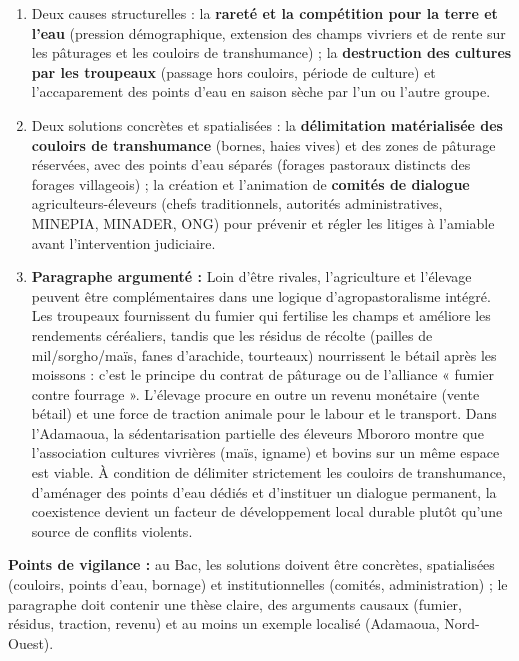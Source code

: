 \documentclass[11pt]{article}
\begin{document}
\begin{corrige}
\begin{enumerate}
\item Deux causes structurelles : la \textbf{rareté et la compétition pour la terre et l'eau} (pression démographique, extension des champs vivriers et de rente sur les pâturages et les couloirs de transhumance) ; la \textbf{destruction des cultures par les troupeaux} (passage hors couloirs, période de culture) et l'accaparement des points d'eau en saison sèche par l'un ou l'autre groupe.
\item Deux solutions concrètes et spatialisées : la \textbf{délimitation matérialisée des couloirs de transhumance} (bornes, haies vives) et des zones de pâturage réservées, avec des points d'eau séparés (forages pastoraux distincts des forages villageois) ; la création et l'animation de \textbf{comités de dialogue} agriculteurs-éleveurs (chefs traditionnels, autorités administratives, MINEPIA, MINADER, ONG) pour prévenir et régler les litiges à l'amiable avant l'intervention judiciaire.
\item \textbf{Paragraphe argumenté :} Loin d'être rivales, l'agriculture et l'élevage peuvent être complémentaires dans une logique d'agropastoralisme intégré. Les troupeaux fournissent du fumier qui fertilise les champs et améliore les rendements céréaliers, tandis que les résidus de récolte (pailles de mil/sorgho/maïs, fanes d'arachide, tourteaux) nourrissent le bétail après les moissons : c'est le principe du contrat de pâturage ou de l'alliance « fumier contre fourrage ». L'élevage procure en outre un revenu monétaire (vente bétail) et une force de traction animale pour le labour et le transport. Dans l'Adamaoua, la sédentarisation partielle des éleveurs Mbororo montre que l'association cultures vivrières (maïs, igname) et bovins sur un même espace est viable. À condition de délimiter strictement les couloirs de transhumance, d'aménager des points d'eau dédiés et d'instituer un dialogue permanent, la coexistence devient un facteur de développement local durable plutôt qu'une source de conflits violents.
\end{enumerate}
\textbf{Points de vigilance :} au Bac, les solutions doivent être concrètes, spatialisées (couloirs, points d'eau, bornage) et institutionnelles (comités, administration) ; le paragraphe doit contenir une thèse claire, des arguments causaux (fumier, résidus, traction, revenu) et au moins un exemple localisé (Adamaoua, Nord-Ouest).
\end{corrige}
\end{document}
